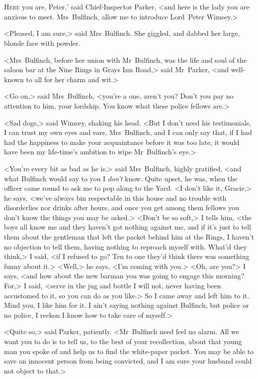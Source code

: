 \chapter[Chapter \thechapter]{}
\lettrine[ante=`]{H}{ere}  you are, Peter,' said Chief-Inspector Parker, <and here is the lady you are anxious to meet. Mrs~Bulfinch, allow me to introduce Lord~Peter Wimsey.>

\zz
<Pleased, I am sure,> said Mrs~Bulfinch. She giggled, and dabbed her large, blonde face with powder.

<Mrs~Bulfinch, before her union with Mr~Bulfinch, was the life and soul of the saloon bar at the Nine Rings in Grays Inn Road,> said Mr~Parker, <and well-known to all for her charm and wit.>

<Go on,> said Mrs~Bulfinch, <you're a one, aren't you? Don't you pay no attention to him, your lordship. You know what these police fellows are.>

<Sad dogs,> said Wimsey, shaking his head. <But I don't need his testimonials, I can trust my own eyes and ears, Mrs~Bulfinch, and I can only say that, if I had had the happiness to make your acquaintance before it was too late, it would have been my life-time's ambition to wipe Mr~Bulfinch's eye.>

<You're every bit as bad as he is,> said Mrs~Bulfinch, highly gratified, <and what Bulfinch would say to you I \emph{don't} know. Quite upset, he was, when the officer came round to ask me to pop along to the Yard. <I don't like it, Gracie,> he says, <we've always bin respectable in this house and no trouble with disorderlies nor drinks after hours, and once you get among them fellows you don't know the things you may be asked.> <Don't be so soft,> I tells him, <the boys all know me and they haven't got nothing against me, and if it's just to tell them about the gentleman that left the packet behind him at the Rings, I haven't no objection to tell them, having nothing to reproach myself with. What'd they think,> I said, <if I refused to go? Ten to one they'd think there was something funny about it.> <Well,> he says, <I'm coming with you.> <Oh, are you?> I says, <and how about the new barman you was going to engage this morning? For,> I said, <serve in the jug and bottle I will not, never having been accustomed to it, so you can do as you like.> So I came away and left him to it. Mind you, I like him for it. I ain't saying nothing against Bulfinch, but police or no police, I reckon I know how to take care of myself.>

<Quite so,> said Parker, patiently. <Mr~Bulfinch need feel no alarm. All we want you to do is to tell us, to the best of your recollection, about that young man you spoke of and help us to find the white-paper packet. You may be able to save an innocent person from being convicted, and I am sure your husband could not object to that.>

